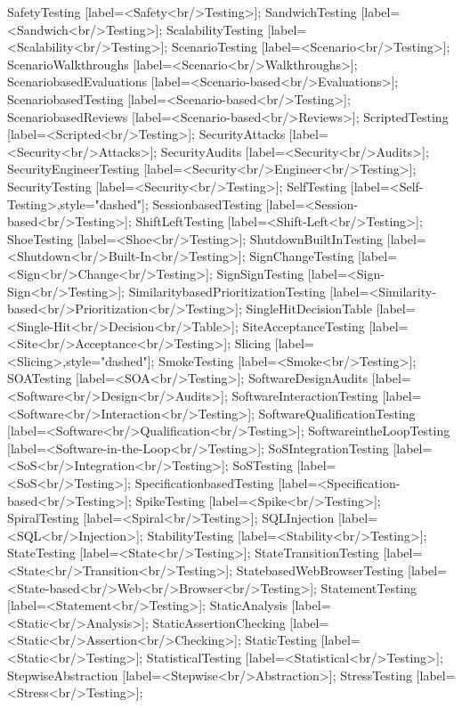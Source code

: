 \documentclass{article}
\begin{document}
{SafetyTesting [label=<Safety<br/>Testing>];
SandwichTesting [label=<Sandwich<br/>Testing>];
ScalabilityTesting [label=<Scalability<br/>Testing>];
ScenarioTesting [label=<Scenario<br/>Testing>];
ScenarioWalkthroughs [label=<Scenario<br/>Walkthroughs>];
ScenariobasedEvaluations [label=<Scenario-based<br/>Evaluations>];
ScenariobasedTesting [label=<Scenario-based<br/>Testing>];
ScenariobasedReviews [label=<Scenario-based<br/>Reviews>];
ScriptedTesting [label=<Scripted<br/>Testing>];
SecurityAttacks [label=<Security<br/>Attacks>];
SecurityAudits [label=<Security<br/>Audits>];
SecurityEngineerTesting [label=<Security<br/>Engineer<br/>Testing>];
SecurityTesting [label=<Security<br/>Testing>];
SelfTesting [label=<Self-Testing>,style="dashed"];
SessionbasedTesting [label=<Session-based<br/>Testing>];
ShiftLeftTesting [label=<Shift-Left<br/>Testing>];
ShoeTesting [label=<Shoe<br/>Testing>];
ShutdownBuiltInTesting [label=<Shutdown<br/>Built-In<br/>Testing>];
SignChangeTesting [label=<Sign<br/>Change<br/>Testing>];
SignSignTesting [label=<Sign-Sign<br/>Testing>];
SimilaritybasedPrioritizationTesting [label=<Similarity-based<br/>Prioritization<br/>Testing>];
SingleHitDecisionTable [label=<Single-Hit<br/>Decision<br/>Table>];
SiteAcceptanceTesting [label=<Site<br/>Acceptance<br/>Testing>];
Slicing [label=<Slicing>,style="dashed"];
SmokeTesting [label=<Smoke<br/>Testing>];
SOATesting [label=<SOA<br/>Testing>];
SoftwareDesignAudits [label=<Software<br/>Design<br/>Audits>];
SoftwareInteractionTesting [label=<Software<br/>Interaction<br/>Testing>];
SoftwareQualificationTesting [label=<Software<br/>Qualification<br/>Testing>];
SoftwareintheLoopTesting [label=<Software-in-the-Loop<br/>Testing>];
SoSIntegrationTesting [label=<SoS<br/>Integration<br/>Testing>];
SoSTesting [label=<SoS<br/>Testing>];
SpecificationbasedTesting [label=<Specification-based<br/>Testing>];
SpikeTesting [label=<Spike<br/>Testing>];
SpiralTesting [label=<Spiral<br/>Testing>];
SQLInjection [label=<SQL<br/>Injection>];
StabilityTesting [label=<Stability<br/>Testing>];
StateTesting [label=<State<br/>Testing>];
StateTransitionTesting [label=<State<br/>Transition<br/>Testing>];
StatebasedWebBrowserTesting [label=<State-based<br/>Web<br/>Browser<br/>Testing>];
StatementTesting [label=<Statement<br/>Testing>];
StaticAnalysis [label=<Static<br/>Analysis>];
StaticAssertionChecking [label=<Static<br/>Assertion<br/>Checking>];
StaticTesting [label=<Static<br/>Testing>];
StatisticalTesting [label=<Statistical<br/>Testing>];
StepwiseAbstraction [label=<Stepwise<br/>Abstraction>];
StressTesting [label=<Stress<br/>Testing>];
}
\end{document}
